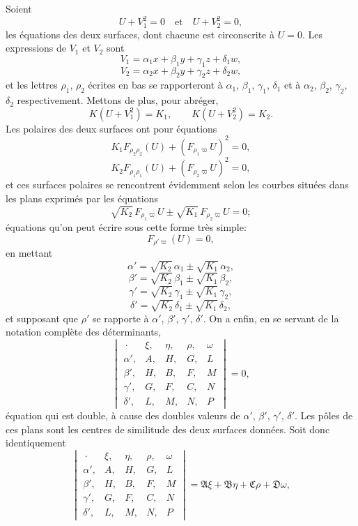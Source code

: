 \documentclass[11pt]{article}
\begin{document}
\smallskip
\noindent Soient
\[
U + V_{1}^{2} = 0 \quad\text{et}\quad U + V_{2}^{2} = 0 \tag{8},
\]
les \'equations des deux surfaces, dont chacune est circonscrite \`a $U = 0$. Les expressions
de $V_{1}$ et $V_{2}$ sont
\[
V_{1} = \alpha_{1} x + \beta_{1} y + \gamma_{1} z + \delta_{1} w,
\]
\[
V_{2} = \alpha_{2} x + \beta_{2} y + \gamma_{2} z + \delta_{2} w, \tag{9}
\]
et les lettres $\rho_{1}$, $\rho_{2}$ \'ecrites en bas se rapporteront \`a $\alpha_{1}$, $\beta_{1}$, $\gamma_{1}$, $\delta_{1}$ et \`a $\alpha_{2}$, $\beta_{2}$, $\gamma_{2}$, $\delta_{2}$
respectivement. Mettons de plus, pour abr\'eger,
\[
K(U + V_{1}^{2}) = K_{1}, \qquad K(U + V_{2}^{2}) = K_{2}. \tag{10}
\]
Les polaires des deux surfaces ont pour \'equations
\[
K_{1} F_{\rho_{2}\rho_{2}}(U) + (F_{\rho_{1}\varpi} U)^{2} = 0,
\]
\[
K_{2} F_{\rho_{1}\rho_{1}}(U) + (F_{\rho_{2}\varpi} U)^{2} = 0, \tag{11}
\]
et ces surfaces polaires se rencontrent \'evidemment selon les courbes situ\'ees dans les
plans exprim\'es par les \'equations
\[
\sqrt{K_{2}}\,F_{\rho_{1}\varpi} U \pm \sqrt{K_{1}}\,F_{\rho_{2}\varpi} U = 0 \tag{12};
\]
\'equations qu'on peut \'ecrire sous cette forme tr\`es simple:
\[
F_{\rho'\varpi}(U) = 0 \tag{13},
\]
en mettant
\[
\alpha' = \sqrt{K_{2}}\,\alpha_{1} \pm \sqrt{K_{1}}\,\alpha_{2},
\]
\[
\beta' = \sqrt{K_{2}}\,\beta_{1} \pm \sqrt{K_{1}}\,\beta_{2},
\]
\[
\gamma' = \sqrt{K_{2}}\,\gamma_{1} \pm \sqrt{K_{1}}\,\gamma_{2},
\]
\[
\delta' = \sqrt{K_{2}}\,\delta_{1} \pm \sqrt{K_{1}}\,\delta_{2}, \tag{14}
\]
et supposant que $\rho'$ se rapporte \`a $\alpha'$, $\beta'$, $\gamma'$, $\delta'$. On a enfin, en se servant de
la notation compl\`ete des d\'eterminants,
\[
\begin{vmatrix} \,\cdot\, & \xi, & \eta, & \rho, & \omega \\ \alpha', & A, & H, & G, & L \\ \beta', & H, & B, & F, & M \\ \gamma', & G, & F, & C, & N \\ \delta', & L, & M, & N, & P \end{vmatrix} = 0 \tag{15},
\]
\'equation qui est double, \`a cause des doubles valeurs de $\alpha'$, $\beta'$, $\gamma'$, $\delta'$. Les p\^oles de ces
plans sont les centres de similitude des deux surfaces donn\'ees. Soit donc identiquement
\[
\begin{vmatrix} \,\cdot\, & \xi, & \eta, & \rho, & \omega \\ \alpha', & A, & H, & G, & L \\ \beta', & H, & B, & F, & M \\ \gamma', & G, & F, & C, & N \\ \delta', & L, & M, & N, & P \end{vmatrix} = \mathfrak{A}\xi + \mathfrak{B}\eta + \mathfrak{C}\rho + \mathfrak{D}\omega \tag{16},
\]
\end{document}
